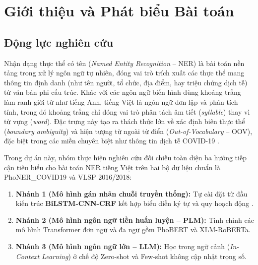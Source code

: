 \section{Giới thiệu và Phát biểu Bài toán}
\label{sec:intro}

\subsection{Động lực nghiên cứu}
Nhận dạng thực thể có tên (\textit{Named Entity Recognition} -- NER) là bài toán nền tảng trong xử lý ngôn ngữ tự nhiên, đóng vai trò trích xuất các thực thể mang thông tin định danh (như tên người, tổ chức, địa điểm, hay triệu chứng dịch tễ) từ văn bản phi cấu trúc. Khác với các ngôn ngữ biến hình dùng khoảng trắng làm ranh giới từ như tiếng Anh, tiếng Việt là ngôn ngữ đơn lập và phân tích tính, trong đó khoảng trắng chỉ đóng vai trò phân tách âm tiết (\textit{syllable}) thay vì từ vựng (\textit{word}). Đặc trưng này tạo ra thách thức lớn về xác định biên thực thể (\textit{boundary ambiguity}) và hiện tượng từ ngoài từ điển (\textit{Out-of-Vocabulary} -- OOV), đặc biệt trong các miền chuyên biệt như thông tin dịch tễ COVID-19 \citep{truong-etal-2021-covid}.

Trong dự án này, nhóm thực hiện nghiên cứu đối chiếu toàn diện ba hướng tiếp cận tiêu biểu cho bài toán NER tiếng Việt trên hai bộ dữ liệu chuẩn là PhoNER\_COVID19 \citep{truong-etal-2021-covid} và VLSP 2016/2018:
\begin{enumerate}
    \item \textbf{Nhánh 1 (Mô hình gán nhãn chuỗi truyền thống):} Tự cài đặt từ đầu kiến trúc \textbf{BiLSTM-CNN-CRF} kết hợp biểu diễn ký tự và quy hoạch động \citep{lample-etal-2016-neural, ma-hovy-2016-end}.
    \item \textbf{Nhánh 2 (Mô hình ngôn ngữ tiền huấn luyện -- PLM):} Tinh chỉnh các mô hình Transformer đơn ngữ và đa ngữ gồm PhoBERT và XLM-RoBERTa.
    \item \textbf{Nhánh 3 (Mô hình ngôn ngữ lớn -- LLM):} Học trong ngữ cảnh (\textit{In-Context Learning}) ở chế độ Zero-shot và Few-shot không cập nhật trọng số.
\end{enumerate}

